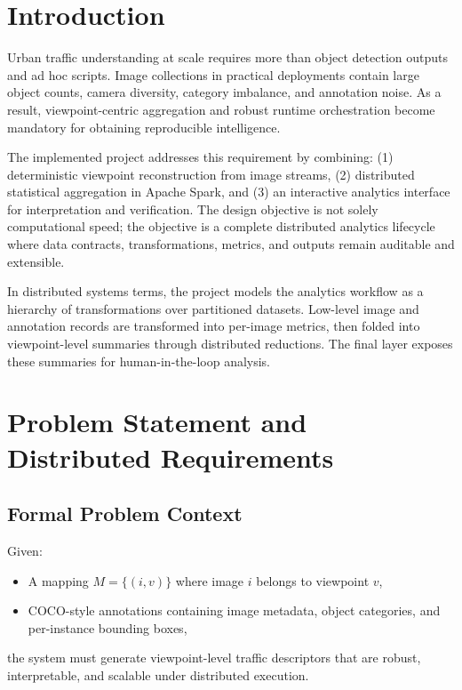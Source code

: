 \documentclass[journal,onecolumn]{IEEEtran}
\begin{document}
\section{Introduction}

Urban traffic understanding at scale requires more than object detection outputs and ad hoc scripts. Image collections in practical deployments contain large object counts, camera diversity, category imbalance, and annotation noise. As a result, viewpoint-centric aggregation and robust runtime orchestration become mandatory for obtaining reproducible intelligence.

The implemented project addresses this requirement by combining: (1) deterministic viewpoint reconstruction from image streams, (2) distributed statistical aggregation in Apache Spark, and (3) an interactive analytics interface for interpretation and verification. The design objective is not solely computational speed; the objective is a complete distributed analytics lifecycle where data contracts, transformations, metrics, and outputs remain auditable and extensible.

In distributed systems terms, the project models the analytics workflow as a hierarchy of transformations over partitioned datasets. Low-level image and annotation records are transformed into per-image metrics, then folded into viewpoint-level summaries through distributed reductions. The final layer exposes these summaries for human-in-the-loop analysis.

\section{Problem Statement and Distributed Requirements}

\subsection{Formal Problem Context}
Given:
\begin{itemize}
    \item A mapping $M = \{(i, v)\}$ where image $i$ belongs to viewpoint $v$,
    \item COCO-style annotations containing image metadata, object categories, and per-instance bounding boxes,
\end{itemize}
the system must generate viewpoint-level traffic descriptors that are robust, interpretable, and scalable under distributed execution.
\end{document}
